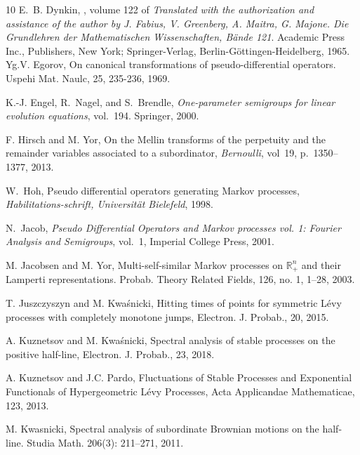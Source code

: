 \documentclass[12pt]{amsart}
\numberwithin{equation}{section}
\newcommand{\bb}{\mathbb}
\theoremstyle{definition}
\theoremstyle{assump}
\theoremstyle{remark}
\begin{document}
{\begin{thebibliography}{10}
E.~B. Dynkin,
, volume 122 of {\em
  Translated with the authorization and assistance of the author by J. Fabius,
  V. Greenberg, A. Maitra, G. Majone. Die Grundlehren der Mathematischen
  Wissenschaften, B\"{a}nde 121}.
\newblock Academic Press Inc., Publishers, New York; Springer-Verlag,
  Berlin-G\"{o}ttingen-Heidelberg, 1965.
Yg.V. Egorov, On canonical transformations of pseudo-differential operators. Uspehi Mat. Naulc, 25, 235-236, 1969.

K.-J. Engel, R.~Nagel, and S.~Brendle, {\em One-parameter semigroups for linear
	evolution equations}, vol.~194.
\newblock Springer, 2000.

F. Hirsch and M. Yor, On the Mellin transforms of the perpetuity and the remainder variables associated to a subordinator, {\em Bernoulli}, vol~19, p.~1350--1377, 2013.

W.~Hoh,  Pseudo differential operators generating Markov processes,  {\em
  Habilitations-schrift, Universit{\"a}t Bielefeld}, 1998.

N.~Jacob, \emph{Pseudo {D}ifferential {O}perators and {M}arkov processes vol.
  1: {F}ourier {A}nalysis and {S}emigroups}, vol.~1, Imperial College Press,
  2001.

M. Jacobsen and M. Yor, Multi-self-similar Markov processes on $\bb{R}^n_+$ and their
Lamperti representations. Probab. Theory Related Fields, 126, no. 1, 1–28, 2003.

T. Juszczyszyn and M. Kwa\'{s}nicki,
     Hitting times of points for symmetric {L}\'{e}vy processes with
              completely monotone jumps,
  {Electron. J. Probab.}, {20}, 2015.



A. Kuznetsov and M.  Kwa\'{s}nicki,
      {Spectral analysis of stable processes on the positive
              half-line},
  {Electron. J. Probab.},
    {23}, {2018}.

		
A. Kuznetsov and J.C. Pardo, Fluctuations of Stable Processes and Exponential Functionals of Hypergeometric L\'evy Processes,
{ Acta Applicandae Mathematicae}, {123}, {2013}.

 M. Kwasnicki,  Spectral analysis of subordinate Brownian motions on the half-line. Studia Math.
206(3): 211–271, 2011.


\end{thebibliography}}
\end{document}
